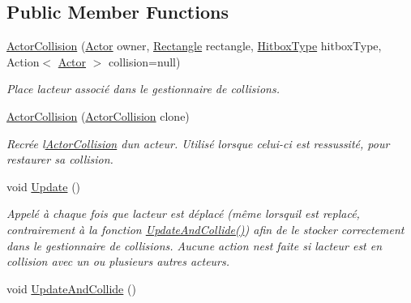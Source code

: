 \subsection*{Public Member Functions}
\begin{DoxyCompactItemize}
\item 
\hyperlink{class_tentacle_slicers_1_1collisions_1_1_actor_collision_afe57c1bade07db8e5d75fc7486dc6439}{Actor\+Collision} (\hyperlink{class_tentacle_slicers_1_1actors_1_1_actor}{Actor} owner, \hyperlink{class_tentacle_slicers_1_1collisions_1_1_rectangle}{Rectangle} rectangle, \hyperlink{namespace_tentacle_slicers_1_1collisions_aa7fd5cb9caf0a56384804b6bc00a6f0e}{Hitbox\+Type} hitbox\+Type, Action$<$ \hyperlink{class_tentacle_slicers_1_1actors_1_1_actor}{Actor} $>$ collision=null)
\begin{DoxyCompactList}\small\item\em Place l\textquotesingle{}acteur associé dans le gestionnaire de collisions. \end{DoxyCompactList}\item 
\hyperlink{class_tentacle_slicers_1_1collisions_1_1_actor_collision_af9a8dd515b5941b2049b106787688bbb}{Actor\+Collision} (\hyperlink{class_tentacle_slicers_1_1collisions_1_1_actor_collision}{Actor\+Collision} clone)
\begin{DoxyCompactList}\small\item\em Recrée l\textquotesingle{}\hyperlink{class_tentacle_slicers_1_1collisions_1_1_actor_collision}{Actor\+Collision} d\textquotesingle{}un acteur. Utilisé lorsque celui-\/ci est ressussité, pour restaurer sa collision. \end{DoxyCompactList}\item 
void \hyperlink{class_tentacle_slicers_1_1collisions_1_1_actor_collision_a947c3ad0a5857b93b32c2259c34e7410}{Update} ()
\begin{DoxyCompactList}\small\item\em Appelé à chaque fois que l\textquotesingle{}acteur est déplacé (même lorsqu\textquotesingle{}il est replacé, contrairement à la fonction \hyperlink{class_tentacle_slicers_1_1collisions_1_1_actor_collision_a46c2289d3374b5e04ab40b81955e1a8e}{Update\+And\+Collide()}) afin de le stocker correctement dans le gestionnaire de collisions. Aucune action n\textquotesingle{}est faite si l\textquotesingle{}acteur est en collision avec un ou plusieurs autres acteurs. \end{DoxyCompactList}\item 
void \hyperlink{class_tentacle_slicers_1_1collisions_1_1_actor_collision_a46c2289d3374b5e04ab40b81955e1a8e}{Update\+And\+Collide} ()

\end{DoxyCompactItemize}
